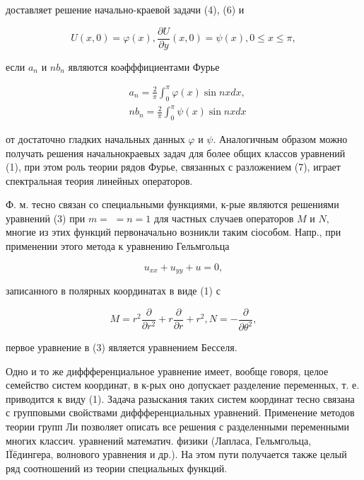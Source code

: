 \documentclass[10pt]{article}
\begin{document}
доставляет решение начально-краевой задачи (4), (6) и



\[

U(x, 0)=\varphi(x), \frac{\partial U}{\partial y}(x, 0)=\psi(x), 0 \leqslant x \leqslant \pi,

\]



если $a_{n}$ и $n b_{n}$ являются коәфффициентами Фурье



\[

\begin{aligned}

& a_{n}=\frac{2}{\pi} \int_{0}^{\pi} \varphi(x) \sin n x d x, \\

& n b_{n}=\frac{2}{\pi} \int_{0}^{\pi} \psi(x) \sin n x d x

\end{aligned}

\]



от достаточно гладких начальных данных $\varphi$ и $\psi$. Аналогичным образом можно получать решения начальнокраевых задач для более общих классов уравнений (1), при этом роль теории рядов Фурье, связанных с разложением (7), играет спектральная теория линейных операторов.



Ф. м. тесно связан со специальными функциями, к-рые являются решениями уравнениӥ (3) при $m=$ $=n=1$ для частных случаев операторов $M$ и $N$, многие из этих функций первоначально возникли таким сіособом. Напр., при применении этого метода к уравнению Гельмгольца



\[

u_{x x}+u_{y y}+u=0,

\]



записанного в полярных координатах в виде (1) с



\[

M=r^{2} \frac{\partial}{\partial r^{2}}+r \frac{\partial}{\partial r}+r^{2}, N=-\frac{\partial}{\partial \theta^{2}},

\]



первое уравнение в (3) является уравнением Бесселя.



Одно и то же диффференциальное уравнение имеет, вообще говоря, целое семейство систем координат, в к-рых оно допускает разделение переменных, т. е. приводится к виду (1). Задача разыскания таких систем координат тесно связана с групповыми свойствами диффференциальных уравнений. Применение методов теории групп Ли позволяет описать все решения с разделенными переменными многих классич. уравнений математич. физики (Лапласа, Гельмгольца, IÏёдингера, волнового уравнения и др.). На этом пути получается также целый ряд соотношений из теории специальных функций.
\end{document}
